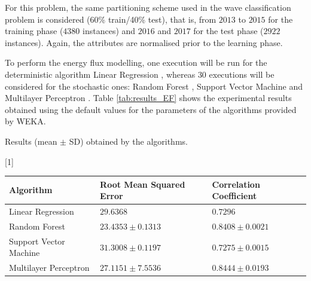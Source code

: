 \documentclass[energies,article,accept,moreauthors,pdftex]{Definitions/mdpi}
\begin{document}
\begin{paracol}{2}
\switchcolumn

			
			For this problem, the same partitioning scheme used in the wave classification problem is considered (60\% train/40\% test), that is, from $2013$ to $2015$ for the training phase ($4380$ instances) and $2016$ and $2017$ for the test phase ($2922$ instances). Again, the attributes are normalised prior to the learning phase.
			
			To perform the energy flux modelling, one execution will be run for the deterministic algorithm Linear Regression \cite{Bishop:2006:PRM:1162264}, whereas $30$ executions will be considered for the stochastic ones: Random Forest \cite{breiman2001random}, Support Vector Machine \cite{cortes1995support} and Multilayer Perceptron \cite{haykin1994neural}. Table \ref{tab:results_EF} shows the experimental results obtained using the default values for the parameters of the algorithms provided by WEKA.

				 \begin{specialtable}[H]
				
					\caption{Results (mean $\pm$ SD) obtained by the algorithms.}
					\label{tab:results_EF}

					\setlength{\cellWidtha}{\columnwidth/3-2\tabcolsep+0.0in}
\setlength{\cellWidthb}{\columnwidth/3-2\tabcolsep+0.0in}
\setlength{\cellWidthc}{\columnwidth/3-2\tabcolsep+0.0in}
\scalebox{1}[1]{\begin{tabularx}{\columnwidth}{>{\PreserveBackslash\centering}m{\cellWidtha}>{\PreserveBackslash\centering}m{\cellWidthb}>{\PreserveBackslash\centering}m{\cellWidthc}}
\toprule
						
						\textbf{Algorithm}&\textbf{Root Mean Squared Error}&\textbf{Correlation Coefficient}\\
	
						\midrule
						
						Linear Regression & $29.6368$ & $0.7296$\\ 		\midrule
						
						Random Forest & $23.4353 \pm 0.1313$ & $0.8408 \pm 0.0021$\\ 		\midrule
						
						Support Vector Machine & $31.3008 \pm 0.1197$ & $0.7275 \pm 0.0015$\\ 		\midrule
						
						Multilayer Perceptron & $27.1151 \pm 7.5536$ & $0.8444 \pm 0.0193$\\


\end{tabularx}}
\end{specialtable}
\end{paracol}
\end{document}
